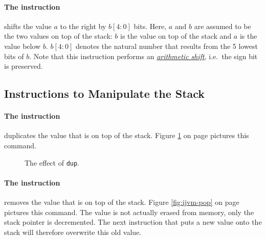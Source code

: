 \paragraph{The instruction }
shifts the value $a$ to the right by $b[4:0]$ bits.  Here, $a$ and $b$ are assumed to be the two
values on top of the stack:  $b$ is the value on top of the stack and $a$ is the value below $b$.
$b[4:0]$ denotes the natural number that results from the 5 lowest bits of $b$.  
Note that this instruction performs an 
\href{http://en.wikipedia.org/wiki/Arithmetic_shift}{\emph{arithmetic shift}}, 
i.e.~the sign bit is preserved.

\subsection{Instructions to Manipulate the Stack}

\paragraph{The instruction }
duplicates the value that is on top of the stack.  Figure \ref{fig:ijvm-dup} on page
\pageref{fig:ijvm-dup} pictures this command.

\setlength{\unitlength}{0.5cm}
\begin{figure}[!ht]
  \centering
{}
  \caption{The effect of \texttt{dup}.}
  \label{fig:ijvm-dup}
\end{figure}


\paragraph{The instruction }
removes the value that is on top of the stack.  Figure \ref{fig:ijvm-pop} on page
\pageref{fig:ijvm-pop} pictures this command.  The value is not actually erased from memory, only
the stack pointer is decremented.  The next instruction that puts a new value onto the stack will
therefore overwrite this old value.


